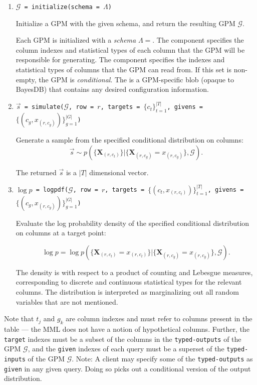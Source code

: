 \documentclass[10pt,letterpaper]{article}
\newcommand{\set}[1]{\{#1\}}
\newcommand{\G}{\mathcal{G}}
\begin{document}
\begin{enumerate}

\item \texttt{$\G$ = initialize(schema = $\Lambda$)}

    Initialize a GPM with the given schema, and return the resulting GPM
    $\G$.

    Each GPM is initialized with a \textit{schema} $\Lambda=$. The  component specifies
    the column indexes and statistical types of each column that the GPM will be
    responsible for generating. The  component specifies the
    indexes and statistical types of columns that the GPM can read
    from.  If this set is non-empty, the GPM is \emph{conditional}.
    The  is a GPM-specific blob (opaque to BayesDB) that contains any
    desired configuration information.

\item \texttt{$\vec{s}$ =
    simulate($\G$, row = $r$, targets = $\set{c_t}_{t=1}^{|T|}$, givens
    = $\set{(c_g, x_{(r,c_g)})}_{g=1}^{|G|}$)}

    Generate a sample from the specified conditional distribution on columns:
    $$
    \vec{s} \sim p( \set{ \mathbf{X}_{(r,c_t)} } |
    \set{ \mathbf{X}_{(r,c_g)} = x_{(r,c_g)} }, \G).
    $$

    The returned $\vec{s}$ is a $|T|$ dimensional vector.

\item \texttt{$\log p$ =
    logpdf($\G$, row = $r$, targets = $\set{(c_t, x_{(r,c_t)})}_{t=1}^{|T|}$,
    givens = $\set{(c_g, x_{(r,c_g)})}_{g=1}^{|G|}$)}

    Evaluate the log probability density of the specified conditional
    distribution on columns at a target point:

    \[
    \log p = \log p( \set{ \mathbf{X}_{(r,c_t)} = x_{(r,c_t)} } |
    \set{ \mathbf{X}_{(r,c_g)} = x_{(r,c_g)} }, \G).
    \]

    The density is with respect to a product of counting and Lebesgue
    measures, corresponding to discrete and continuous statistical
    types for the relevant columns.  The distribution is interpreted
    as marginalizing out all random variables that are not mentioned.

\end{enumerate}

Note that $t_j$ and $g_k$ are column indexes and must refer to columns
present in the table --- the MML does not have a notion of hypothetical
columns.  Further, the \texttt{target} indexes must be a subset of the
columns in the \texttt{typed-outputs} of the GPM $\G$, and
the \texttt{given} indexes of each query must be a superset of the
\texttt{typed-inputs} of the GPM $\G$.  Note: A client may
specify some of the \texttt{typed-outputs} as \texttt{given} in any
given query.  Doing so picks out a conditional version of the output
distribution.
\end{document}
